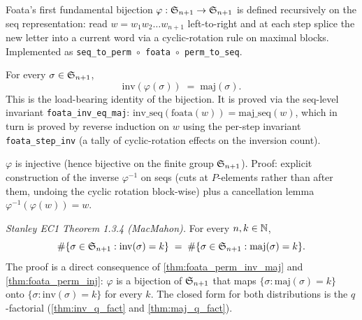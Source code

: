 \begin{definition}
  \label{def:foata_perm}
  \rocqok
  Foata's first fundamental bijection
  $\varphi : \mathfrak{S}_{n+1} \to \mathfrak{S}_{n+1}$ is defined recursively on
  the seq representation: read $w = w_1 w_2 \dots w_{n+1}$ left-to-right
  and at each step splice the new letter into a current word via a
  cyclic-rotation rule on maximal blocks.  Implemented as
  \texttt{seq\_to\_perm $\circ$ foata $\circ$ perm\_to\_seq}.
\end{definition}

\begin{theorem}
  \label{thm:foata_perm_inv_maj}
  \rocqok
  For every $\sigma \in \mathfrak{S}_{n+1}$,
  \[
    \mathrm{inv}(\varphi(\sigma)) \;=\; \mathrm{maj}(\sigma).
  \]
  This is the load-bearing identity of the bijection.  It is proved
  via the seq-level invariant
  \texttt{foata\_inv\_eq\_maj}: $\mathrm{inv\_seq}(\mathrm{foata}(w)) =
  \mathrm{maj\_seq}(w)$, which in turn is proved by reverse induction
  on $w$ using the per-step invariant
  \texttt{foata\_step\_inv} (a tally of cyclic-rotation effects on the
  inversion count).
\end{theorem}

\begin{theorem}
  \label{thm:foata_perm_inj}
  \rocqok
  $\varphi$ is injective (hence bijective on the finite group $\mathfrak{S}_{n+1}$).
  Proof: explicit construction of the inverse $\varphi^{-1}$ on seqs
  (cuts at $P$-elements rather than after them, undoing the cyclic
  rotation block-wise) plus a cancellation lemma
  $\varphi^{-1}(\varphi(w)) = w$.
\end{theorem}

\begin{theorem}
  \label{thm:inv_maj_equidistr}
  \rocqok
  \emph{Stanley EC1 Theorem 1.3.4 (MacMahon).}  For every $n, k \in \mathbb{N}$,
  \[
    \#\{\sigma \in \mathfrak{S}_{n+1} : \mathrm{inv}(\sigma) = k\}
    \;=\;
    \#\{\sigma \in \mathfrak{S}_{n+1} : \mathrm{maj}(\sigma) = k\}.
  \]
  The proof is a direct consequence of \cref{thm:foata_perm_inv_maj}
  and \cref{thm:foata_perm_inj}: $\varphi$ is a bijection of
  $\mathfrak{S}_{n+1}$ that maps $\{\sigma : \mathrm{maj}(\sigma) = k\}$ onto
  $\{\sigma : \mathrm{inv}(\sigma) = k\}$ for every $k$.  The closed
  form for both distributions is the $q$-factorial
  (\cref{thm:inv_q_fact} and \cref{thm:maj_q_fact}).
\end{theorem}

